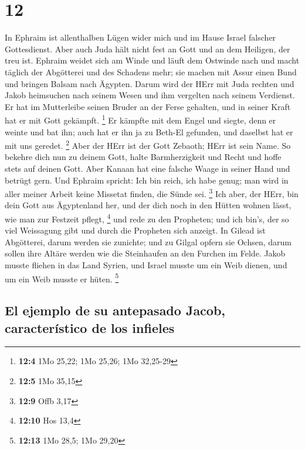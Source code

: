 \hypertarget{section-11}{%
\section{12}\label{section-11}}

 In Ephraim ist allenthalben Lügen wider mich und im Hause
Israel falscher Gottesdienst. Aber auch Juda hält nicht fest an Gott und
an dem Heiligen, der treu ist.  Ephraim weidet sich am
Winde und läuft dem Ostwinde nach und macht täglich der Abgötterei und
des Schadens mehr; sie machen mit Assur einen Bund und bringen Balsam
nach Ägypten.  Darum wird der HErr mit Juda rechten und
Jakob heimsuchen nach seinem Wesen und ihm vergelten nach seinem
Verdienst.  Er hat im Mutterleibe seinen Bruder an der
Ferse gehalten, und in seiner Kraft hat er mit Gott gekämpft.
\footnote{\textbf{12:4} 1Mo 25,22; 1Mo 25,26; 1Mo 32,25-29}
 Er kämpfte mit dem Engel und siegte, denn er weinte und
bat ihn; auch hat er ihn ja zu Beth-El gefunden, und daselbst hat er mit
uns geredet. \footnote{\textbf{12:5} 1Mo 35,15}  Aber der
HErr ist der Gott Zebaoth; HErr ist sein Name.  So bekehre
dich nun zu deinem Gott, halte Barmherzigkeit und Recht und hoffe stets
auf deinen Gott.  Aber Kanaan hat eine falsche Waage in
seiner Hand und betrügt gern.  Und Ephraim spricht: Ich
bin reich, ich habe genug; man wird in aller meiner Arbeit keine
Missetat finden, die Sünde sei. \footnote{\textbf{12:9} Offb 3,17}
 Ich aber, der HErr, bin dein Gott aus Ägyptenland her,
und der dich noch in den Hütten wohnen lässt, wie man zur Festzeit
pflegt, \footnote{\textbf{12:10} Hos 13,4}  und rede zu
den Propheten; und ich bin's, der so viel Weissagung gibt und durch die
Propheten sich anzeigt.  In Gilead ist Abgötterei, darum
werden sie zunichte; und zu Gilgal opfern sie Ochsen, darum sollen ihre
Altäre werden wie die Steinhaufen an den Furchen im Felde.
 Jakob musste fliehen in das Land Syrien, und Israel
musste um ein Weib dienen, und um ein Weib musste er hüten. \footnote{\textbf{12:13}
  1Mo 28,5; 1Mo 29,20}

\hypertarget{el-ejemplo-de-su-antepasado-jacob-caracteruxedstico-de-los-infieles}{%
\subsection{El ejemplo de su antepasado Jacob, característico de los
infieles}\label{el-ejemplo-de-su-antepasado-jacob-caracteruxedstico-de-los-infieles}}

